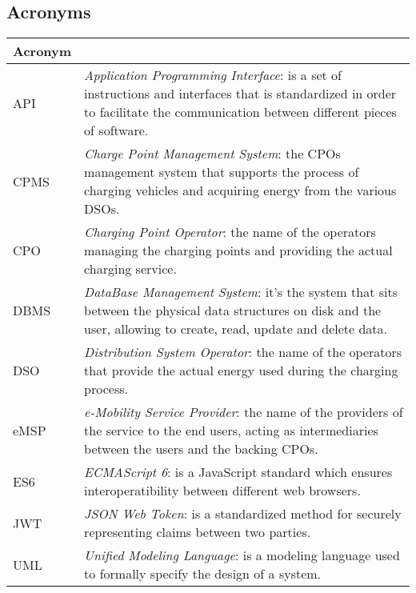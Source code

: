 \subsection{Acronyms}

\begin{center}
    \begin{tabular}{ | >{\centering\arraybackslash}m{} | >{\arraybackslash}m{} | }
        \hline
        \textbf{Acronym} & \multicolumn{1}{c|}{\textbf{Description}} \\
        \hline
        \hline
        API & \textit{Application Programming Interface}: is a set of instructions and interfaces that is standardized in order to facilitate the communication between different pieces of software. \\
        \hline
        CPMS & \textit{Charge Point Management System}: the CPOs management system that supports the process of charging vehicles and acquiring energy from the various DSOs. \\
        \hline
        CPO & \textit{Charging Point Operator}: the name of the operators managing the charging points and providing the actual charging service. \\
        \hline
        DBMS & \textit{DataBase Management System}: it's the system that sits between the physical data structures on disk and the user, allowing to create, read, update and delete data. \\
        \hline
        DSO & \textit{Distribution System Operator}: the name of the operators that provide the actual energy used during the charging process. \\
        \hline
        eMSP & \textit{e-Mobility Service Provider}: the name of the providers of the service to the end users, acting as intermediaries between the users and the backing CPOs. \\
        \hline
        ES6 & \textit{ECMAScript 6}: is a JavaScript standard which ensures interoperatibility between different web browsers. \\
        \hline
        JWT & \textit{JSON Web Token}: is a standardized method for securely representing claims between two parties. \\
        \hline
        UML & \textit{Unified Modeling Language}: is a modeling language used to formally specify the design of a system. \\
        \hline
    \end{tabular}
\end{center}

